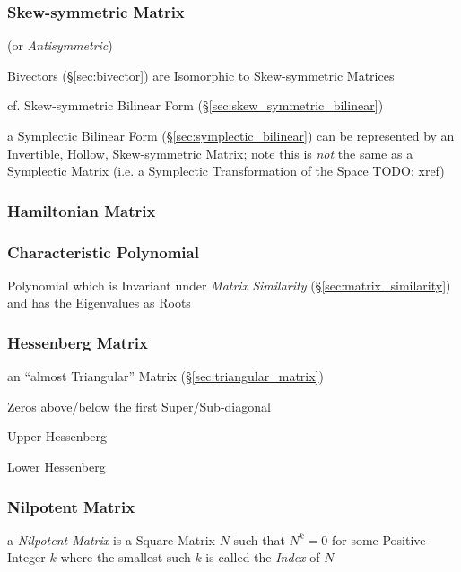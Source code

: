 \subsubsection{Skew-symmetric Matrix}\label{sec:skew_symmetric_matrix}

(or \emph{Antisymmetric})

Bivectors (\S\ref{sec:bivector}) are Isomorphic to Skew-symmetric Matrices

\fist cf. Skew-symmetric Bilinear Form (\S\ref{sec:skew_symmetric_bilinear})

a Symplectic Bilinear Form (\S\ref{sec:symplectic_bilinear}) can be represented
by an Invertible, Hollow, Skew-symmetric Matrix; note this is \emph{not} the
same as a Symplectic Matrix (i.e. a Symplectic Transformation of the Space
TODO: xref)



\subsubsection{Hamiltonian Matrix}\label{sec:hamiltonian_matrix}

\subsubsection{Characteristic Polynomial}\label{sec:characteristic_polynomial}

Polynomial which is Invariant under \emph{Matrix Similarity}
(\S\ref{sec:matrix_similarity}) and has the Eigenvalues as Roots



\subsubsection{Hessenberg Matrix}\label{sec:hessenberg_matrix}

an ``almost Triangular'' Matrix (\S\ref{sec:triangular_matrix})

Zeros above/below the first Super/Sub-diagonal

Upper Hessenberg

Lower Hessenberg



\subsubsection{Nilpotent Matrix}\label{sec:nilpotent_matrix}

a \emph{Nilpotent Matrix} is a Square Matrix $N$ such that $N^k = 0$ for some
Positive Integer $k$ where the smallest such $k$ is called the \emph{Index} of
$N$



